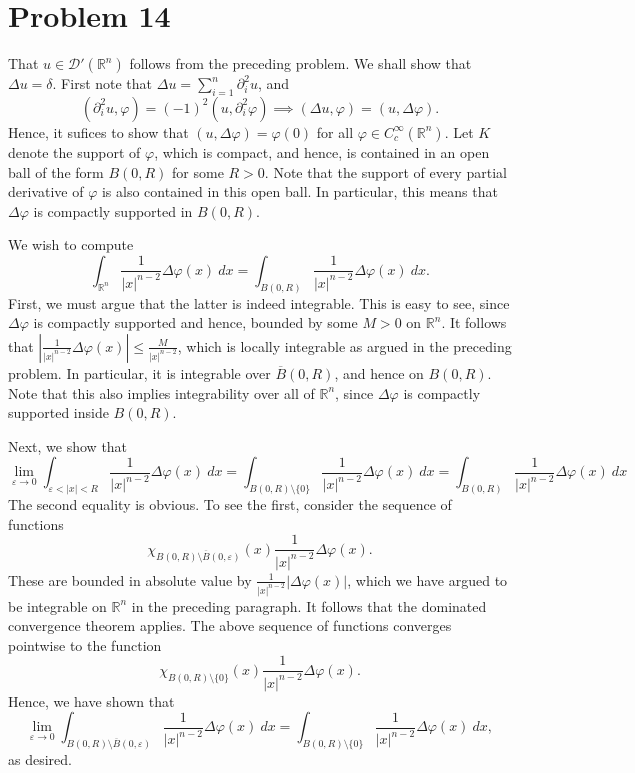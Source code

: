 \documentclass[10pt]{amsart}
\theoremstyle{thmstyle}
\theoremstyle{defstyle}
\newcommand{\R}{\mathbb{R}}
\renewcommand{\le}{\leqslant}
\begin{document}
\section{Problem 14}
That $u\in\mathscr D'(\R^n)$ follows from the preceding problem. We shall show that $\Delta u = \delta$. First note that $\Delta u = \sum_{i = 1}^n\partial_i^2 u$, and 
\begin{equation*}
	(\partial_i^2 u, \varphi) = (-1)^2(u,\partial_i^2\varphi)\implies(\Delta u, \varphi) = (u,\Delta\varphi).
\end{equation*}
Hence, it sufices to show that $(u,\Delta\varphi) = \varphi(0)$ for all $\varphi\in C_c^\infty(\R^n)$. Let $K$ denote the support of $\varphi$, which is compact, and hence, is contained in an open ball of the form $B(0, R)$ for some $R > 0$. Note that the support of every partial derivative of $\varphi$ is also contained in this open ball. In particular, this means that $\Delta\varphi$ is compactly supported in $B(0, R)$.

We wish to compute 
\begin{equation*}
	\int_{\R^n}\frac{1}{|x|^{n - 2}}\Delta\varphi(x)~dx = \int_{B(0, R)}\frac{1}{|x|^{n - 2}}\Delta\varphi(x)~dx.
\end{equation*}
First, we must argue that the latter is indeed integrable. This is easy to see, since $\Delta\varphi$ is compactly supported and hence, bounded by some $M > 0$ on $\R^n$. It follows that $\left|\frac{1}{|x|^{n - 2}}\Delta\varphi(x)\right|\le\frac{M}{|x|^{n - 2}}$, which is locally integrable as argued in the preceding problem. In particular, it is integrable over $\overline B(0, R)$, and hence on $B(0, R)$. Note that this also implies integrability over all of $\R^n$, since $\Delta\varphi$ is compactly supported inside $B(0, R)$.

Next, we show that
\begin{equation*}
	\lim_{\varepsilon\to 0}\int_{\varepsilon < |x| < R}\frac{1}{|x|^{n - 2}}\Delta\varphi(x)~dx = \int_{B(0, R)\setminus\{0\}}\frac{1}{|x|^{n - 2}}\Delta\varphi(x)~dx = \int_{B(0, R)}\frac{1}{|x|^{n - 2}}\Delta\varphi(x)~dx
\end{equation*}
The second equality is obvious. To see the first, consider the sequence of functions 
\begin{equation*}
	\chi_{B(0, R)\setminus\overline B(0,\varepsilon)}(x)\frac{1}{|x|^{n - 2}}\Delta\varphi(x).
\end{equation*}
These are bounded in absolute value by $\frac{1}{|x|^{n - 2}}|\Delta\varphi(x)|$, which we have argued to be integrable on $\R^n$ in the preceding paragraph. It follows that the dominated convergence theorem applies. The above sequence of functions converges pointwise to the function 
\begin{equation*}
	\chi_{B(0, R)\setminus\{0\}}(x)\frac{1}{|x|^{n - 2}}\Delta\varphi(x).
\end{equation*}
Hence, we have shown that 
\begin{equation*}
	\lim_{\varepsilon\to 0}\int_{B(0, R)\setminus\overline B(0,\varepsilon)}\frac{1}{|x|^{n - 2}}\Delta\varphi(x)~dx = \int_{B(0, R)\setminus\{0\}}\frac{1}{|x|^{n - 2}}\Delta\varphi(x)~dx,
\end{equation*}
as desired.
\end{document}
